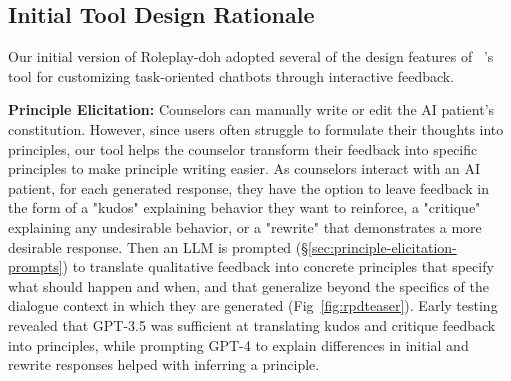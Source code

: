 \documentclass[11pt]{article}
\begin{document}
\subsection{Initial Tool Design Rationale} \label{sec:initialtooldesignrationale}

Our initial version of Roleplay-doh 
adopted several of the design features of ~\citet{petridis2023constitutionmaker}'s tool for customizing task-oriented chatbots through interactive feedback. 

\textbf{Principle Elicitation:} Counselors can manually write or edit the AI patient's constitution. However, since users often struggle to formulate their thoughts into principles, our tool helps the counselor transform their feedback into specific principles to make principle writing easier. As counselors interact with an AI patient, for each generated response, they have the option to leave feedback in the form of a "kudos" explaining behavior they want to reinforce, a "critique" explaining any undesirable behavior, or a "rewrite" that demonstrates a more desirable response. Then an LLM is prompted (\S\ref{sec:principle-elicitation-prompts}) to translate qualitative feedback into concrete principles that specify what should happen and when, and that generalize beyond the specifics of the dialogue context in which they are generated (Fig~\ref{fig:rpdteaser}).
Early testing revealed that GPT-3.5 was sufficient at translating kudos and critique feedback into principles, while prompting GPT-4 to explain differences in initial and rewrite responses helped with inferring a principle.  
\end{document}
